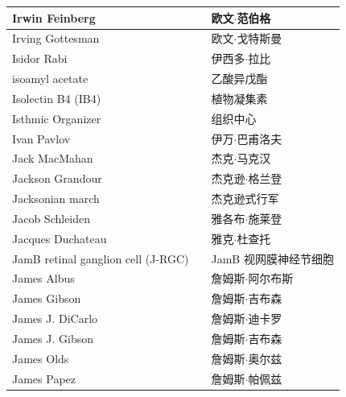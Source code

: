\begin{longtable}{lll}
	\midrule
	Irwin Feinberg && 欧文$\cdot$范伯格 \\
	
	\midrule
	Irving Gottesman   && 欧文$\cdot$戈特斯曼  \\
	
	\midrule
	Isidor Rabi   && 伊西多$\cdot$拉比  \\
	
	\midrule
	isoamyl acetate   && 乙酸异戊酯  \\
	
	\midrule
	Isolectin B4 (IB4)   && 植物凝集素  \\
	
	\midrule
	Isthmic Organizer   && 组织中心  \\
	
	\midrule
	Ivan Pavlov   && 伊万$\cdot$巴甫洛夫  \\
	
	\midrule
	Jack MacMahan   && 杰克$\cdot$马克汉  \\
	
	\midrule
	Jackson Grandour   && 杰克逊$\cdot$格兰登  \\
	
	\midrule
	Jacksonian march   && 杰克逊式行军  \\
	
	\midrule
	Jacob Schleiden   && 雅各布$\cdot$施莱登  \\
	
	\midrule
	Jacques Duchateau   && 雅克$\cdot$杜查托  \\
	
	\midrule
	JamB retinal ganglion cell (J-RGC)   && JamB 视网膜神经节细胞  \\
	
	\midrule
	James Albus   && 詹姆斯$\cdot$阿尔布斯  \\
	
	\midrule
	James Gibson   && 詹姆斯$\cdot$吉布森  \\
	
	\midrule
	James J. DiCarlo   && 詹姆斯$\cdot$迪卡罗  \\
	
	\midrule
	James J. Gibson   && 詹姆斯$\cdot$吉布森  \\
	
	\midrule
	James Olds   && 詹姆斯$\cdot$奥尔兹  \\
	
	\midrule
	James Papez   && 詹姆斯$\cdot$帕佩兹  \\
	

\end{longtable}
